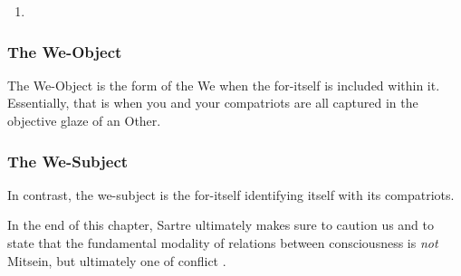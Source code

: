 \begin{enumerate}
  \item {}
\end{enumerate}

\subsubsection{The We-Object}
The We-Object is the form of the We when the for-itself is included within it. Essentially, that is when you and your compatriots are all captured in the objective glaze of an Other.

\subsubsection{The We-Subject}
In contrast, the we-subject is the for-itself identifying itself with its compatriots. 

\noindent
In the end of this chapter, Sartre ultimately makes sure to caution us and to state that the fundamental modality of relations between consciousness is \emph{not} Mitsein, but ultimately one of conflict \autocite[564]{sartre}.
